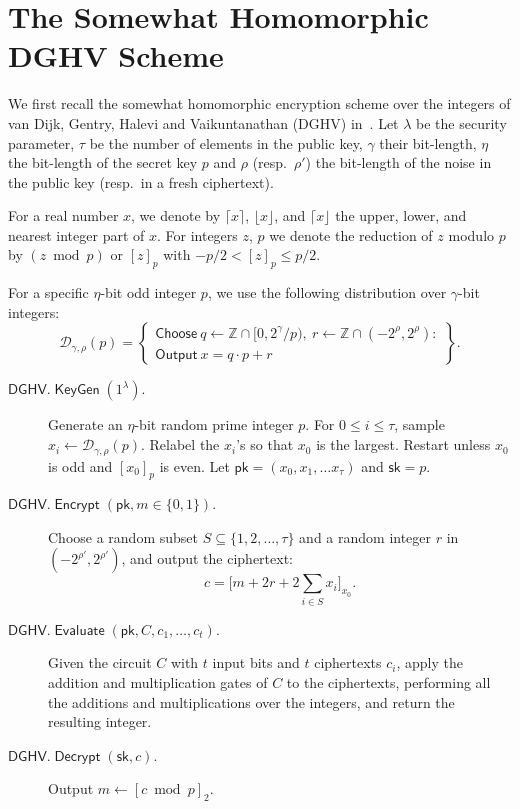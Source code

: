 \documentclass{llncs}
\renewcommand\leq\leqslant
\DeclareMathOperator{\KeyGen}{\ensuremath{\mathsf{KeyGen}}}
\DeclareMathOperator{\Encrypt}{\ensuremath{\mathsf{Encrypt}}}
\DeclareMathOperator{\Decrypt}{\ensuremath{\mathsf{Decrypt}}}
\DeclareMathOperator{\Evaluate}{\ensuremath{\mathsf{Evaluate}}}
\newcommand*\Choose{\ensuremath{\mathsf{Choose}\ }}
\newcommand*\Output{\ensuremath{\mathsf{Output}\ }}
\newcommand*{\pk}{\ensuremath{\mathsf{pk}}}
\newcommand*{\sk}{\ensuremath{\mathsf{sk}}}
\newcommand*{\DGHV}{\ensuremath{\mathsf{DGHV}}}
\begin{document}
\section{The Somewhat Homomorphic DGHV Scheme}
\label{sec:dghv}

We first recall the somewhat homomorphic encryption scheme
over the integers of van Dijk, Gentry, Halevi and
Vaikuntanathan (DGHV) in~\cite{vDGHV2010}. Let $\lambda$ be the
security parameter, $\tau$ be the number of elements in the public
key, $\gamma$ their bit-length, $\eta$
the bit-length of the secret key $p$ and $\rho$ (resp.\ $\rho'$) the
bit-length of the noise in the public key (resp.\ in a fresh
ciphertext). 

For a real number
$x$, we denote by $\lceil x \rceil$, $\lfloor x \rfloor$, and $\lceil x
\rfloor$ the upper, lower, and nearest integer part of $x$. For
integers $z$, $p$ we denote the reduction of $z$ modulo $p$ by
$(z\bmod p)$ or $[z]_p$ with $-p/2 < [z]_p \leq p/2$. 

For a specific $\eta$-bit odd integer $p$, we use the following distribution over $\gamma$-bit integers:
\[ \mathcal{D}_{\gamma,\rho}(p) = \left\{ \begin{array}{c}\Choose q \leftarrow \mathbb{Z} \cap [0,2^\gamma/p),~
r \leftarrow \mathbb{Z} \cap (-2^\rho,2^\rho) :\\ \Output x =
q \cdot p + r \end{array}\right\}. \]

\begin{description}
\item[$\DGHV.\KeyGen(1^\lambda)$.] Generate an $\eta$-bit random prime integer $p$. For $0 \leq i \leq \tau$, sample $
x_i \leftarrow \mathcal{D}_{\gamma,\rho}(p) $. Relabel the $x_i$'s  so
that $x_0$ is the largest. Restart unless $x_0$ is odd and $[x_0]_p$
is even. Let $\pk=(x_0,x_1,\ldots x_\tau)$ and $\sk=p$.
\\\vspace{-0.25cm}
\item[$\DGHV.\Encrypt(\pk, m \in \{0,1\})$.] Choose a random subset $S \subseteq
\{1,2,\ldots,\tau\}$ and a random integer $r$ in
$(-2^{\rho'}, 2^{\rho'})$, and output the ciphertext:
\begin{equation}
\label{eq:DGHV}
 c = \bigg[ m+2r+2 \sum\limits_{i \in S} x_i \bigg]_{x_0}.
\end{equation}
\vspace{-0.25cm}
\item[$\DGHV.\Evaluate(\pk, C, c_1, \ldots, c_t)$.] Given the circuit
$C$ with $t$ input bits and $t$ ciphertexts $c_i$, apply the addition
and multiplication gates of $C$ to the ciphertexts, performing all the
additions and multiplications over the integers, and return the
resulting integer.
\\\vspace{-0.25cm}
\item[$\DGHV.\Decrypt(\sk, c)$.] Output $m \leftarrow [c \bmod p]_2$.
\end{description}
\end{document}
